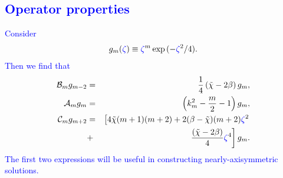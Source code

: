 \documentclass[apj]{emulateapj}
\def\blue#1{\textcolor{blue}{ #1}}
\newcommand{\beqn}{\begin{eqnarray}}
\newcommand{\eeqn}{\end{eqnarray}}
\newcommand{\tilchi}{\tilde\chi}
\begin{document}
\blue{\subsection{Operator properties}}

\blue{
Consider 
\begin{align}
	g_m(\blue{\zeta}) \equiv \blue{\zeta}^m\exp{(-\blue{\zeta}^2/4)}.
\end{align}
Then we find that 
\beqn
\mathcal{B}_mg_{m-2} &=&\frac{1}{4}\left(\tilchi - 2\beta\right)g_m,\\
\mathcal{A}_mg_m &=& \left(k_m^2 - \frac{m}{2} - 1\right)g_m,\\
\mathcal{C}_mg_{m+2}&=& \left[4\tilchi(m+1)(m+2) +2(\beta-\tilchi)(m+2)\blue{\zeta}^2 \right.
\notag\\ &+&\left. \frac{\left(\tilchi - 2\beta\right)}{4}\blue{\zeta}^4\right]g_m. 
\eeqn
The first two expressions will be useful in constructing nearly-axisymmetric solutions. 
}
\end{document}
